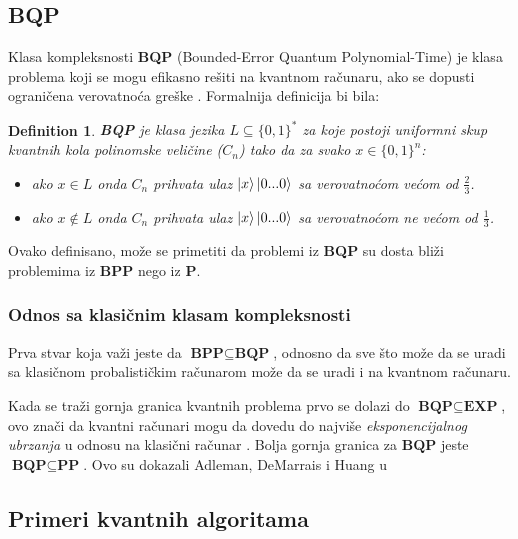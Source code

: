 \documentclass[12pt, letterpaper, oneside]{article}
\newtheorem{definition}{Definition}
\begin{document}
\subsection{BQP}
Klasa kompleksnosti \textbf{BQP} (Bounded-Error Quantum Polynomial-Time) je klasa problema koji se mogu efikasno rešiti na kvantnom računaru, ako se dopusti ograničena verovatnoća greške \cite{nielsen_chuang_10th}.
Formalnija definicija bi bila:\cite{aaronson2013quantum}
\begin{definition}
    \textbf{BQP} je klasa jezika $L \subseteq \{0,1\}^{*}$ za koje postoji uniformni skup kvantnih kola polinomske veličine ($C_n$)
    tako da za svako $x \in \{0,1\}^{n}$:
    \begin{itemize}
        \item ako $x \in L$ onda $C_n$ prihvata ulaz $\Ket{x}\Ket{0...0}$ sa verovatnoćom većom od $\frac{2}{3}$.
        \item ako $x \notin L$ onda $C_n$ prihvata ulaz $\Ket{x}\Ket{0...0}$ sa verovatnoćom ne većom od $\frac{1}{3}$.
    \end{itemize} 
\end{definition}
Ovako definisano, može se primetiti da problemi iz \textbf{BQP} su dosta bliži problemima iz \textbf{BPP} nego iz \textbf{P}.
\subsubsection*{Odnos sa klasičnim klasam kompleksnosti}
Prva stvar koja važi jeste da $\textbf{BPP} \subseteq \textbf{BQP}$, odnosno da sve što može da se uradi sa klasičnom probalističkim računarom može da 
se uradi i na kvantnom računaru.

Kada se traži gornja granica kvantnih problema prvo se dolazi do $\textbf{BQP} \subseteq \textbf{EXP}$, ovo znači da kvantni računari mogu da dovedu
do najviše \textit{eksponencijalnog ubrzanja} u odnosu na klasični računar \cite{aaronson2013quantum}.
Bolja gornja granica za $\textbf{BQP}$ jeste $\textbf{BQP} \subseteq \textbf{PP}$. Ovo su dokazali Adleman, DeMarrais i Huang u \cite{adleman1997quantum}
\subsection{Primeri kvantnih algoritama}
\end{document}
